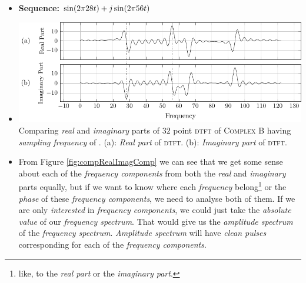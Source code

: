 \documentclass[../../course]{subfiles}
\begin{document}
\begin{itemize} [label=]
        \begin{itemize} [label=]

            \item \textbf{Sequence:} $\sin(2 \pi 28 t) + j \sin(2 \pi 56 t)$

            \item
                \begin{minipage}[b] {0.85\textwidth}
                    \vspace{6pt}
                    \centering
                     {
                        \includegraphics[height = 0.8\textheight] {tikzpics/plotCompRealImagComp.pdf}
                    }
                     {
                        Comparing \emph{real} and \emph{imaginary} parts of $32$ point \textsc{dtft}
                        of \textsc{Complex B} having \emph{sampling frequency} of \sampFreqSligGreatJust.
                        (a): \emph{Real part} of \textsc{dtft}.
                        (b): \emph{Imaginary part} of \textsc{dtft}.
                    }
                    \label{fig:compRealImagComp}
                \end{minipage}

            \item From Figure \ref{fig:compRealImagComp} we can see that we get
                some sense about each of the \emph{frequency components} from
                both the \emph{real} and \emph{imaginary} parts equally, but if
                we want to know where each \emph{frequency}
                belong\footnote{\label{fnt:whereBelong}like, to the \emph{real part} or the
                \emph{imaginary part}.} or the \emph{phase} of these
                \emph{frequency components}, we need to analyse both of them.
                If we are only \emph{interested} in \emph{frequency
                components}, we could just take the \emph{absolute value} of
                our \emph{frequency spectrum}. That would give us the
                \emph{amplitude spectrum} of the \emph{frequency spectrum}.
                \emph{Amplitude spectrum} will have \emph{clean pulses}
                corresponding for each of the \emph{frequency components}.


\end{itemize}
\end{itemize}
\end{document}
